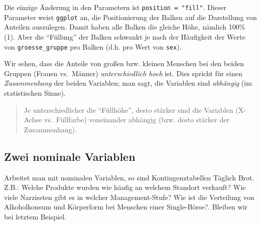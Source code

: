 \documentclass[12pt,ngerman,]{book}
\makeatletter
\newenvironment{Shaded}{\begin{snugshade}}{\end{snugshade}}
\newcommand{\KeywordTok}[1]{\textcolor[rgb]{0.13,0.29,0.53}{\textbf{#1}}}
\newcommand{\DataTypeTok}[1]{\textcolor[rgb]{0.13,0.29,0.53}{#1}}
\newcommand{\DecValTok}[1]{\textcolor[rgb]{0.00,0.00,0.81}{#1}}
\newcommand{\StringTok}[1]{\textcolor[rgb]{0.31,0.60,0.02}{#1}}
\newcommand{\OperatorTok}[1]{\textcolor[rgb]{0.81,0.36,0.00}{\textbf{#1}}}
\newcommand{\NormalTok}[1]{#1}
\newenvironment{kframe}{%
\medskip{}
\setlength{\fboxsep}{.8em}
 \def\at@end@of@kframe{}%
 \ifinner\ifhmode%
  \def\at@end@of@kframe{\end{minipage}}%
  \begin{minipage}{\columnwidth}%
 \fi\fi%
 \def\FrameCommand##1{\hskip\@totalleftmargin \hskip-\fboxsep
 \colorbox{shadecolor}{##1}\hskip-\fboxsep
     \hskip-\linewidth \hskip-\@totalleftmargin \hskip\columnwidth}%
 \MakeFramed {\advance\hsize-\width
   \@totalleftmargin\z@ \linewidth\hsize
   \@setminipage}}%
 {\par\unskip\endMakeFramed%
 \at@end@of@kframe}
\renewenvironment{Shaded}{\begin{kframe}}{\end{kframe}}
\theoremstyle{definition}
\theoremstyle{definition}
\theoremstyle{remark}
\makeatother
\begin{document}
Die einzige Änderung in den Parametern ist \texttt{position\ =\ "fill"}.
Dieser Parameter weist \texttt{ggplot} an, die Positionierung der Balken
auf die Darstellung von Anteilen auszulegen. Damit haben alle Balken die
gleiche Höhe, nämlich 100\% (1). Aber die ``Füllung'' der Balken
schwankt je nach der Häufigkeit der Werte von \texttt{groesse\_gruppe}
pro Balken (d.h. pro Wert von \texttt{sex}).

Wir sehen, dass die Anteile von großen bzw. kleinen Menschen bei den
beiden Gruppen (Frauen vs.~Männer) \emph{unterschiedlich hoch} ist. Dies
spricht für einen \emph{Zusammenhang} der beiden Variablen; man sagt,
die Variablen sind \emph{abhängig} (im statistischen Sinne).

\begin{quote}
Je unterschiedlicher die ``Füllhöhe'', desto stärker sind die Variablen
(X-Achse vs.~Füllfarbe) voneinander abhängig (bzw. desto stärker der
Zusammenhang).
\end{quote}

\subsection{Zwei nominale Variablen}\label{zwei-nominale-variablen}

Arbeitet man mit nominalen Variablen, so sind Kontingenztabellen Täglich
Brot. Z.B.: Welche Produkte wurden wie häufig an welchem Standort
verkauft? Wie viele Narzissten gibt es in welcher Management-Stufe? Wie
ist die Verteilung von Alkoholkonsum und Körperform bei Menschen einer
Single-Börse?. Bleiben wir bei letztem Beispiel.

\begin{Shaded}
\end{Shaded}
\end{document}

